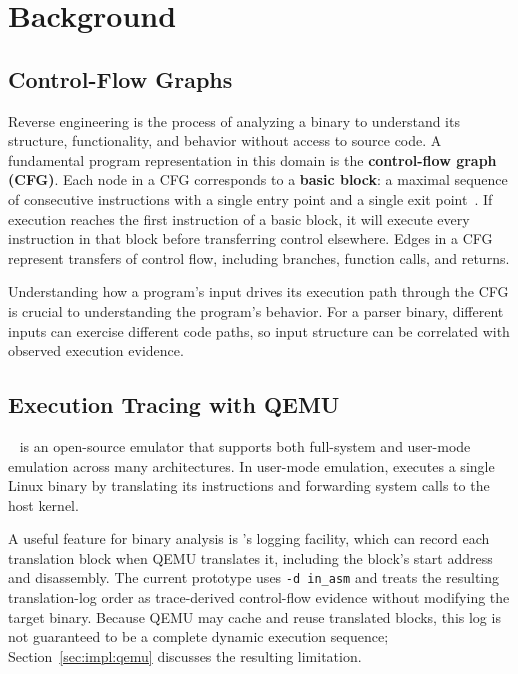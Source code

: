 \section{Background}\label{sec:background}

\subsection{Control-Flow Graphs}\label{sec:bg:cfg}

Reverse engineering is the process of analyzing a binary to understand its structure, functionality, and behavior without access to source code.
A fundamental program representation in this domain is the \textbf{control-flow graph (CFG)}.
Each node in a CFG corresponds to a \textbf{basic block}: a maximal sequence of consecutive instructions with a single entry point and a single exit point~\cite{shoshitaishvili2016sok}.
If execution reaches the first instruction of a basic block, it will execute every instruction in that block before transferring control elsewhere.
Edges in a CFG represent transfers of control flow, including branches, function calls, and returns.

Understanding how a program's input drives its execution path through the CFG is crucial to understanding the program's behavior.
For a parser binary, different inputs can exercise different code paths, so input structure can be correlated with observed execution evidence.

\subsection{Execution Tracing with QEMU}\label{sec:bg:qemu}

\QEMU~\cite{bellard2005qemu} is an open-source emulator that supports both full-system and user-mode emulation across many architectures.
In user-mode emulation, \QEMU executes a single Linux binary by translating its instructions and forwarding system calls to the host kernel.

A useful feature for binary analysis is \QEMU's logging facility, which can record each translation block when QEMU translates it, including the block's start address and disassembly.
The current prototype uses \texttt{-d in\_asm} and treats the resulting translation-log order as trace-derived control-flow evidence without modifying the target binary.
Because QEMU may cache and reuse translated blocks, this log is not guaranteed to be a complete dynamic execution sequence; Section~\ref{sec:impl:qemu} discusses the resulting limitation.

